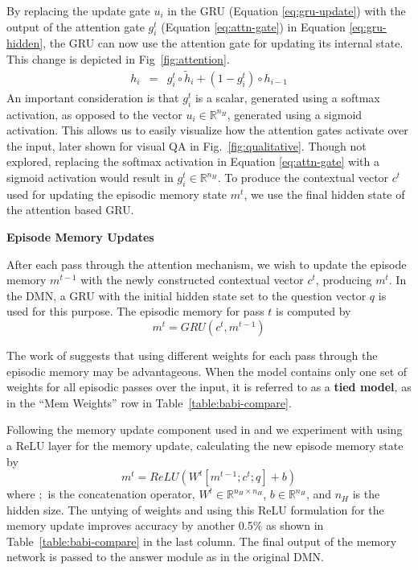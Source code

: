 \documentclass{article}
\begin{document}
By replacing the update gate $u_i$ in the GRU (Equation \ref{eq:gru-update}) with the output of the attention gate $g^t_i$ (Equation \ref{eq:attn-gate}) in Equation \ref{eq:gru-hidden}, the GRU can now use the attention gate for updating its internal state.
This change is depicted in Fig~\ref{fig:attention}.
\begin{eqnarray}
h_i &=&  g^t_i \circ \tilde{h}_i + (1-g^t_i) \circ h_{i-1}
\end{eqnarray}
An important consideration is that $g^t_i$ is a scalar, generated using a softmax activation, as opposed to the vector $u_i \in \mathbb{R}^{n_H}$, generated using a sigmoid activation.
This allows us to easily visualize how the attention gates activate over the input, later shown for visual QA in Fig.~\ref{fig:qualitative}.
Though not explored, replacing the softmax activation in Equation \ref{eq:attn-gate} with a sigmoid activation would result in $g^t_i \in \mathbb{R}^{n_H}$.
To produce the contextual vector $c^t$ used for updating the episodic memory state $m^t$, we use the final hidden state of the attention based GRU.

\textbf{Episode Memory Updates}

After each pass through the attention mechanism, we wish to update the episode memory $m^{t-1}$ with the newly constructed contextual vector $c^t$, producing $m^t$.
In the DMN, a GRU with the initial hidden state set to the question vector $q$ is used for this purpose.
The episodic memory for pass $t$ is computed by
\begin{equation}
m^t = GRU(c^t, m^{t-1})
\end{equation}

The work of \citet{Sukhbaatar2015} suggests that using different weights for each pass through the episodic memory may be advantageous.
When the model contains only one set of weights for all episodic passes over the input, it is referred to as a \textbf{tied model}, as in the ``Mem Weights'' row in Table~\ref{table:babi-compare}.



Following the memory update component used in \citet{Sukhbaatar2015} and \citet{Peng2015} we experiment with using a ReLU layer for the memory update, calculating the new episode memory state by
\begin{equation}
m^t = ReLU\left(W^t [m^{t-1} ; c^t ; q] + b\right)
\end{equation}
where $;$ is the concatenation operator, $W^t \in \mathbb{R}^{n_H \times n_H}$, $b \in \mathbb{R}^{n_H}$, and $n_H$ is the hidden size.
The untying of weights and using this ReLU formulation for the memory update improves accuracy by another 0.5\% as shown in Table~\ref{table:babi-compare} in the last column.
The final output of the memory network is passed to the answer module as in the original DMN.
\end{document}
